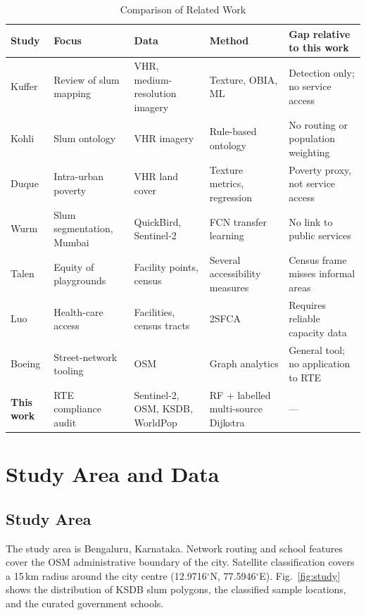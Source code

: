 \documentclass[conference]{IEEEtran}
\newcommand{\km}{\,km}
\begin{document}
\begin{table}[!t]
\centering
\caption{Comparison of Related Work}
\label{tab:lit}
\footnotesize
\begin{tabularx}{\textwidth}{@{}p{1.6cm}p{3.0cm}p{3.1cm}p{3.1cm}X@{}}
\toprule
\textbf{Study} & \textbf{Focus} & \textbf{Data} & \textbf{Method} & \textbf{Gap relative to this work} \\
\midrule
Kuffer \cite{kuffer2016} & Review of slum mapping & VHR, medium-resolution imagery & Texture, OBIA, ML & Detection only; no service access \\
Kohli \cite{kohli2012} & Slum ontology & VHR imagery & Rule-based ontology & No routing or population weighting \\
Duque \cite{duque2015} & Intra-urban poverty & VHR land cover & Texture metrics, regression & Poverty proxy, not service access \\
Wurm \cite{wurm2019} & Slum segmentation, Mumbai & QuickBird, Sentinel-2 & FCN transfer learning & No link to public services \\
Talen \cite{talen1998} & Equity of playgrounds & Facility points, census & Several accessibility measures & Census frame misses informal areas \\
Luo \cite{luo2003} & Health-care access & Facilities, census tracts & 2SFCA & Requires reliable capacity data \\
Boeing \cite{boeing2017} & Street-network tooling & OSM & Graph analytics & General tool; no application to RTE \\
\textbf{This work} & RTE compliance audit & Sentinel-2, OSM, KSDB, WorldPop & RF + labelled multi-source Dijkstra & --- \\
\bottomrule
\end{tabularx}
\end{table}

\section{Study Area and Data}\label{sec:data}
\subsection{Study Area}
The study area is Bengaluru, Karnataka. Network routing and school features cover the OSM administrative boundary of the city. Satellite classification covers a 15\km{} radius around the city centre (12.9716$^\circ$N, 77.5946$^\circ$E). Fig.~\ref{fig:study} shows the distribution of KSDB slum polygons, the classified sample locations, and the curated government schools.
\end{document}

